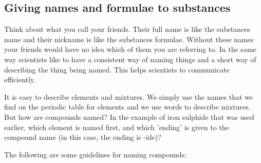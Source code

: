             \subsection{ Giving names and formulae to substances}
            \nopagebreak
      \label{m38708*eip-379}Think about what you call your friends. Their full name is like the substances name and their nickname is like the substances formulae. Without these names your friends would have no idea which of them you are referring to. In the same way scientists like to have a consistent way of naming things and a short way of describing the thing being named. This helps scientists to communicate efficiently.     \par \label{m38708*id64028}It is easy to describe elements and mixtures. We simply use the names that we find on the periodic table for elements and we use words to describe mixtures. But how are compounds named? In the example of iron sulphide that was used earlier, which element is named first, and which 'ending' is given to the compound name (in this case, the ending is -ide)? \par 
      \label{m38708*id64033}The following are some guidelines for naming compounds:\par 
